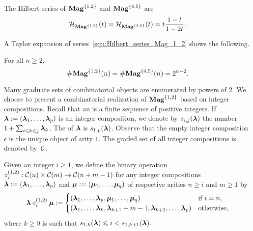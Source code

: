 \begin{Theorem} \label{thm:Hilbert_series_Mag_1_2}
    The Hilbert series of $\mathbf{Mag}^{\{1, 2\}}$ and $\mathbf{Mag}^{\{4, 5\}}$ are
    \begin{equation} \label{equ:Hilbert_series_Mag_1_2}
        \mathcal{H}_{\mathbf{Mag}^{\{1, 2\}}}(t)
        = \mathcal{H}_{\mathbf{Mag}^{\{4, 5\}}}(t) =
        t \frac{1 - t}{1 - 2t}.
    \end{equation}
\end{Theorem}
\medbreak

A Taylor expansion of series~\eqref{equ:Hilbert_series_Mag_1_2} shows
the following.
\medbreak

\begin{Proposition} \label{prop:Close_formula_Mag_1_2}
    For all $n \geq 2,$
    \begin{equation} \label{equ:Close_formula_Mag_1_2}
        \# \mathbf{Mag}^{\{1, 2\}}(n) = \# \mathbf{Mag}^{\{4, 5\}}(n) = 2^{n-2}.
    \end{equation}
\end{Proposition}
\medbreak

Many graduate sets of combinatorial objects are enumerated by powers of
$2$. We choose to present a combinatorial realization of
$\mathbf{Mag}^{\{1, 2\}}$ based on integer compositions. Recall that an
 is a finite sequence of positive integers. If
$\bm{\lambda} := \left(\bm{\lambda}_1, \dots, \bm{\lambda}_p\right)$ is an integer
composition, we denote by $s_{i, j}(\bm{\lambda})$ the number
$1 + \sum_{i \leqslant k \leqslant j} \bm{\lambda}_k$. The  of $\bm{\lambda}$
is $s_{1, p}(\bm{\lambda})$. Observe that the empty integer composition
$\epsilon$ is the unique object of arity $1$. The graded set of all
integer compositions is denoted by~$\mathcal{C}$.
\medbreak

Given an integer $i \geq 1$, we define the binary operation
\begin{math}
    \circ_i^{(1,2)} : \mathcal{C}(n) \times \mathcal{C}(m)
    \to\mathcal{C}(n + m - 1)
\end{math}
for any integer compositions
$\bm{\lambda} := \left(\bm{\lambda}_1, \dots, \bm{\lambda}_p\right)$ and
$\bm{\mu} := \left(\bm{\mu}_1, \dots, \bm{\mu}_q\right)$ of respective arities
$n \geq i$ and $m \geq 1$ by
\begin{equation}
    \bm{\lambda} \circ_i^{(1,2)} \bm{\mu} :=
    \begin{cases}
        \left(\bm{\lambda}_1, \dots, \bm{\lambda}_p,
        \bm{\mu}_1, \dots, \bm{\mu}_q\right) &
        \mbox{if } i = n, \\
        \left(\bm{\lambda}_1, \dots, \bm{\lambda}_k, \bm{\lambda}_{k + 1} + m - 1,
        \bm{\lambda}_{k + 2}, \dots, \bm{\lambda}_p\right)
            & \mbox{otherwise},
    \end{cases}
\end{equation}
where $k \geq 0$ is such that
\begin{math}
    s_{1, k}(\bm{\lambda}) \leqslant i < s_{1, k + 1}(\bm{\lambda}).
\end{math}
\medbreak

